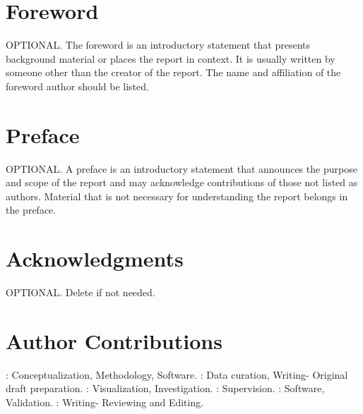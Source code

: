 \begin{titlepage}
 \tagpdfparaOff {} 
\section*{Foreword}
 \tagmcend
 \tagstructend
 \tagpdfparaOn
OPTIONAL. The foreword is an introductory statement that presents background material or places the report in context. It is usually written by someone other than the creator of the report. The name and affiliation of the foreword author should be listed.
 
 \tagpdfparaOff {}
\section*{Preface}
\tagmcend
 \tagstructend
 \tagpdfparaOn
OPTIONAL. A preface is an introductory statement that announces the purpose and scope of the report and may acknowledge contributions of those not listed as authors. Material that is not necessary for understanding the report belongs in the preface. 
 
 \tagpdfparaOff {}
\section*{Acknowledgments}
\tagmcend
 \tagstructend
 \tagpdfparaOn
OPTIONAL. Delete if not needed.
 
 \tagpdfparaOff {}
\section*{Author Contributions}
\tagmcend
 \tagstructend
\tagpdfparaOn

\textbf{\authorone}: Conceptualization, Methodology, Software. \textbf{\authortwo}: Data curation, Writing- Original draft preparation. \textbf{\authorthree}: Visualization, Investigation. \textbf{\authorfour}: Supervision. \textbf{\authorfive}: Software, Validation. \textbf{\authorsix}: Writing- Reviewing and Editing.
 

\end{titlepage}
